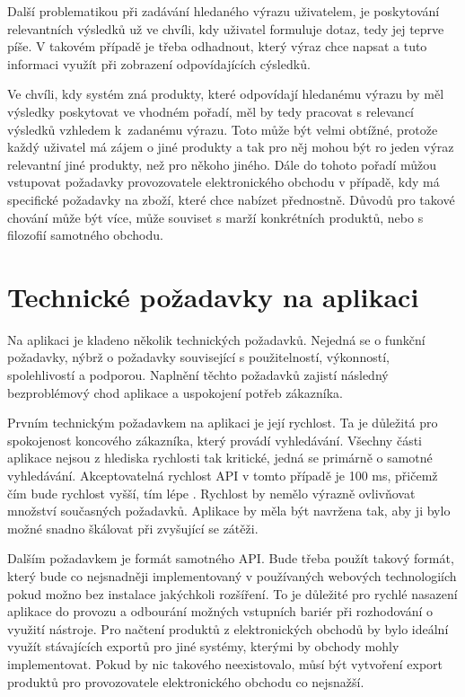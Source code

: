 \documentclass[FM,DP]{tulthesis}
\begin{document}
Další problematikou při zadávání hledaného výrazu uživatelem, je poskytování relevantních výsledků
už ve chvíli, kdy uživatel formuluje dotaz, tedy jej teprve píše. V takovém případě je třeba
odhadnout, který výraz chce napsat a tuto informaci využít při zobrazení odpovídajících
cýsledků.

Ve chvíli, kdy systém zná produkty, které odpovídají hledanému výrazu by měl
výsledky poskytovat ve vhodném pořadí, měl by tedy pracovat s relevancí výsledků vzhledem 
k~zadanému výrazu. Toto může být velmi obtížné, protože každý uživatel má zájem o jiné
produkty a tak pro něj mohou být ro jeden výraz relevantní jiné produkty, než pro někoho
jiného. Dále do tohoto pořadí můžou vstupovat požadavky provozovatele elektronického obchodu
v případě, kdy má specifické požadavky na zboží, které chce nabízet přednostně. Důvodů
pro takové chování může být více, může souviset s marží konkrétních produktů, 
nebo s filozofií samotného obchodu.

\section{Technické požadavky na aplikaci}

Na aplikaci je kladeno několik technických požadavků. Nejedná se o funkční požadavky, nýbrž
o požadavky související s použitelností, výkonností, spolehlivostí a podporou. Naplnění těchto
požadavků zajistí následný bezproblémový chod aplikace a uspokojení potřeb zákazníka.

Prvním technickým požadavkem na aplikaci je její rychlost. Ta je důležitá pro spokojenost
koncového zákazníka, který provádí vyhledávání. Všechny části aplikace nejsou z hlediska rychlosti
tak kritické, jedná se primárně o samotné vyhledávání. Akceptovatelná rychlost API v tomto 
případě je 100 ms, přičemž čím bude rychlost vyšší, tím lépe \cite{amazon-100ms}. 
Rychlost by nemělo výrazně ovlivňovat množství současných požadavků. 
Aplikace by měla být navržena tak, aby ji bylo možné snadno škálovat při zvyšující se zátěži.

Dalším požadavkem je formát samotného API. Bude třeba použít takový formát, který bude
co nejsnadněji implementovaný v používaných webových technologiích pokud možno bez instalace
jakýchkoli rozšíření. To je důležité pro rychlé nasazení aplikace do provozu a odbourání
možných vstupních bariér při rozhodování o využití nástroje. Pro načtení produktů
z elektronických obchodů by bylo ideální využít stávajících exportů pro jiné systémy, 
kterými by obchody mohly implementovat. Pokud by nic takového neexistovalo, můsí být vytvoření
export produktů pro provozovatele elektronického obchodu co nejsnažší.
\end{document}
